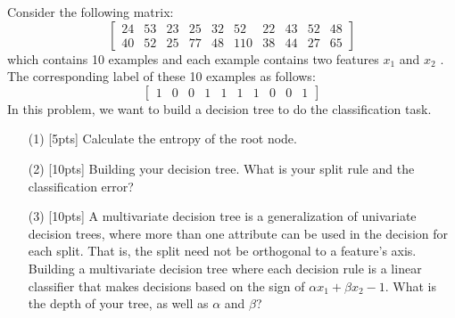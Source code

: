 \begin{problem}
    Consider the following matrix:
    \[\left[
        \begin{matrix}
            24 & 53 & 23 & 25 & 32 & 52 & 22 & 43 & 52 & 48\\
            40 & 52 & 25 & 77 & 48 & 110 & 38 & 44 & 27 & 65
        \end{matrix}
        \right]
    \]
    which contains 10 examples and each example contains two features $x_1$ and $x_2$ . The corresponding label of these 10 examples as follows:
    \[\left[
        \begin{matrix}
            1 & 0 & 0 & 1 & 1 & 1 & 1 & 0 & 0 & 1
        \end{matrix}
        \right]
    \]
    In this problem, we want to build a decision tree to do the classiﬁcation task.
    \begin{enumerate}
        \item[(1)][5pts] Calculate the entropy of the root node.
        \item[(2)][10pts] Building your decision tree. What is your split rule and the classiﬁcation error?
        \item[(3)][10pts] A multivariate decision tree is a generalization of univariate decision trees, where more than one attribute can be used in the decision for each split. That is, the split need not be orthogonal to a feature’s axis.\\
            Building a multivariate decision tree where each decision rule is a linear classiﬁer that makes decisions based on the sign of $\alpha x_1 + \beta x_2 − 1$. What is the depth of your tree, as well as $\alpha$ and $\beta$?
    \end{enumerate}
\end{problem}



